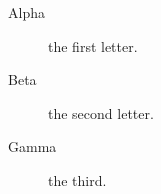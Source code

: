 \documentclass{article}
\begin{document}
\begin{description}
  \item[Alpha] the first letter.
  \item[Beta] the second letter.
  \item[Gamma] the third.
\end{description}
\end{document}
